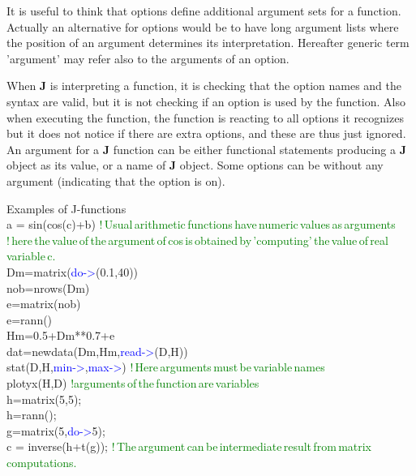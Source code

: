\begin{note}
It is useful to think that options define additional argument sets for a function. Actually
an alternative for options would be to have long argument lists where the position of an
argument determines its interpretation. Hereafter generic term 'argument' may refer also to
the arguments of an option.
\end{note}
\begin{note}
When \textbf{J} is interpreting a function, it is checking that the option names and the syntax
are valid, but it is not checking if an option is used by the function. Also when executing the
function, the function is reacting to all options it recognizes but it does not notice if there are
extra options, and these are thus just ignored.
An argument for a \textbf{J} function can be either functional statements producing a \textbf{J} object as its
value, or a name of \textbf{J} object. Some options can be without any argument (indicating that the
option is on).
\end{note}
\begin{example}[jfuncex]Examples of J-functions\\
\label{jfuncex}
a = \textcolor{VioletRed}{sin}(\textcolor{VioletRed}{cos}(c)+b) \textcolor{green}{!\,Usual\,arithmetic\,functions\,have\,numeric\,values\,as\,arguments}\\
\textcolor{green}{!\,here\,the\,value\,of\,the\,argument\,of\,cos\,is\,obtained\,by\,'computing'\,the\,value\,of\,real\,variable\,c.}\\
Dm=\textcolor{VioletRed}{matrix}(\textcolor{blue}{do->}(0.1,40))\\
nob=\textcolor{VioletRed}{nrows}(Dm)\\
e=\textcolor{VioletRed}{matrix}(nob)\\
e=\textcolor{VioletRed}{rann}()\\
Hm=0.5+Dm**0.7+e\\
dat=\textcolor{VioletRed}{newdata}(Dm,Hm,\textcolor{blue}{read->}(D,H))\\
\textcolor{VioletRed}{stat}(D,H,\textcolor{blue}{min->},\textcolor{blue}{max->}) \textcolor{green}{!\,Here\,arguments\,must\,be\,variable\,names}\\
\textcolor{VioletRed}{plotyx}(H,D) \textcolor{green}{!arguments\,of\,the\,function\,are\,variables}\\
h=\textcolor{VioletRed}{matrix}(5,5);\\
h=\textcolor{VioletRed}{rann}();\\
g=\textcolor{VioletRed}{matrix}(5,\textcolor{blue}{do->}5);\\
c = \textcolor{VioletRed}{inverse}(h+\textcolor{VioletRed}{t}(g)); \textcolor{green}{!\,The\,argument\,can\,be\,intermediate\,result\,from\,matrix\,computations.}
\end{example}
